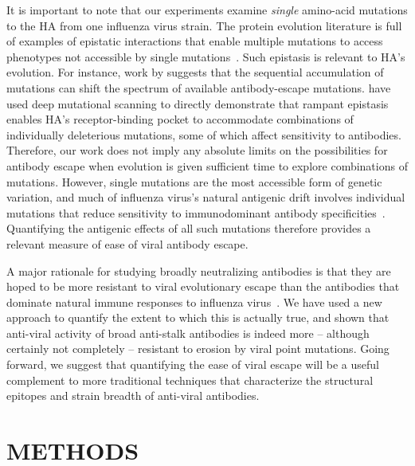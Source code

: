 \documentclass[11pt]{article}
\begin{document}
It is important to note that our experiments examine \emph{single} amino-acid mutations to the HA from one influenza virus strain.
The protein evolution literature is full of examples of epistatic interactions that enable multiple mutations to access phenotypes not accessible by single mutations~\citep{gong2013stability,harms2014historical,starr2017alternative}.
Such epistasis is relevant to HA's evolution.  
For instance, work by \citet{das2013defining} suggests that the sequential accumulation of mutations can shift the spectrum of available antibody-escape mutations.
\citet{wu2017diversity} have used deep mutational scanning to directly demonstrate that rampant epistasis enables HA's receptor-binding pocket to accommodate combinations of individually deleterious mutations, some of which affect sensitivity to antibodies.
Therefore, our work does not imply any absolute limits on the possibilities for antibody escape when evolution is given sufficient time to explore combinations of mutations.
However, single mutations are the most accessible form of genetic variation, and much of influenza virus's natural antigenic drift involves individual mutations that reduce sensitivity to immunodominant antibody specificities~\citep{yewdell1979antigenic,webster1980determination,koel2013substitutions,chambers2015identification,petrie2016antibodies,neher2016prediction}.
Quantifying the antigenic effects of all such mutations therefore provides a relevant measure of ease of viral antibody escape. 

A major rationale for studying broadly neutralizing antibodies is that they are hoped to be more resistant to viral evolutionary escape than the antibodies that dominate natural immune responses to influenza virus~\citep{krammer2015advances,corti2017tackling}.
We have used a new approach to quantify the extent to which this is actually true, and shown that anti-viral activity of broad anti-stalk antibodies is indeed more -- although certainly not completely -- resistant to erosion by viral point mutations.
Going forward, we suggest that quantifying the ease of viral escape will be a useful complement to more traditional techniques that characterize the structural epitopes and strain breadth of anti-viral antibodies.

\clearpage
\small

\section*{METHODS}
\label{sec:methods}
\end{document}
